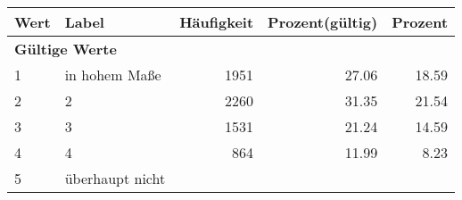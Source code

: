      \begin{longtable}{lXrrr}
     \toprule
     \textbf{Wert} & \textbf{Label} & \textbf{Häufigkeit} & \textbf{Prozent(gültig)} & \textbf{Prozent} \\
     \endhead
     \midrule
     \multicolumn{5}{l}{\textbf{Gültige Werte}}\\

     1 &
     \multicolumn{1}{X}{ in hohem Maße   } &


       \num{1951} &
       \num[round-mode=places,round-precision=2]{27.06} &
         \num[round-mode=places,round-precision=2]{18.59} \\

     2 &
     \multicolumn{1}{X}{ 2   } &


       \num{2260} &
       \num[round-mode=places,round-precision=2]{31.35} &
         \num[round-mode=places,round-precision=2]{21.54} \\

     3 &
     \multicolumn{1}{X}{ 3   } &


       \num{1531} &
       \num[round-mode=places,round-precision=2]{21.24} &
         \num[round-mode=places,round-precision=2]{14.59} \\

     4 &
     \multicolumn{1}{X}{ 4   } &


       \num{864} &
       \num[round-mode=places,round-precision=2]{11.99} &
         \num[round-mode=places,round-precision=2]{8.23} \\

     5 &
     \multicolumn{1}{X}{ überhaupt nicht   } &



\end{longtable}
